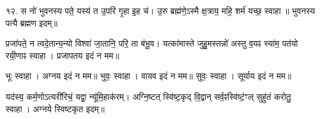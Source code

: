 १२. स नो॑ भुवनस्य पते॒ यस्य॑ त उ॒परि॑ गृ॒हा इ॒ह च॑।
उ॒रु ब्रह्म॑णे॒ऽस्मै क्ष॒त्राय॒ महि॒ शर्म॑ यच्छ॒ स्वाहा॥ भुवनस्य पत्यै ब्रह्मण इदम्॥

प्रजा॑पते॒ न त्वदे॒तान्य॒न्यो विश्वा॑ जा॒तानि॒ परि॒ ता ब॑भू॒व।
यत्का॑मास्ते जुहु॒मस्तन्नो॑ अस्तु व॒यꣴ स्या॑म॒ पत॑यो रयी॒णाꣴ स्वाहा। प्रजापतय इदं न मम॥

भूः स्वाहा। अग्नय इदं न मम॥
भुवः॒ स्वाहा। वायव इदं न मम॥
सुवः॒ स्वाहा। सूर्याय इदं न मम॥   

यद॑स्य॒ कर्म॒णोऽत्यरी॑रिचं॒ यद्वा॒ न्यू॑मि॒हाक॑रम्। अग्नि॒ष्टत् स्वि॑ष्ट॒कृद् वि॒द्वान् सर्व॒ꣴस्वि॑ष्टं॒ꣳल् सुहु॑तं करोतु॒ स्वाहा। अग्नये स्विष्टकृत इदम्॥